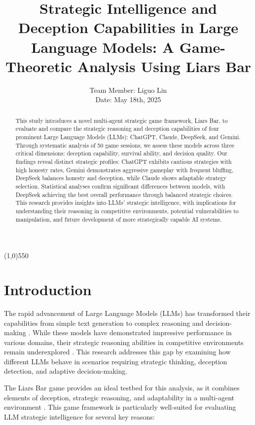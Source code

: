 \documentclass{article}
\title{Strategic Intelligence and Deception Capabilities in Large Language Models: A Game-Theoretic Analysis Using Liars Bar}
\author{Team Member: Liguo Lin \\ Date: May 18th, 2025}
\date{}
\begin{document}
\maketitle

\begin{abstract}
This study introduces a novel multi-agent strategic game framework, Liars Bar, to evaluate and compare the strategic reasoning and deception capabilities of four prominent Large Language Models (LLMs): ChatGPT, Claude, DeepSeek, and Gemini. Through systematic analysis of 50 game sessions, we assess these models across three critical dimensions: deception capability, survival ability, and decision quality. Our findings reveal distinct strategic profiles: ChatGPT exhibits cautious strategies with high honesty rates, Gemini demonstrates aggressive gameplay with frequent bluffing, DeepSeek balances honesty and deception, while Claude shows adaptable strategy selection. Statistical analyses confirm significant differences between models, with DeepSeek achieving the best overall performance through balanced strategic choices. This research provides insights into LLMs' strategic intelligence, with implications for understanding their reasoning in competitive environments, potential vulnerabilities to manipulation, and future development of more strategically capable AI systems.
\end{abstract}

\line(1,0){550} 
\section{Introduction}
The rapid advancement of Large Language Models (LLMs) has transformed their capabilities from simple text generation to complex reasoning and decision-making \cite{wei2022emergent, bubeck2023sparks}. While these models have demonstrated impressive performance in various domains, their strategic reasoning abilities in competitive environments remain underexplored \cite{gandhi2023}. This research addresses this gap by examining how different LLMs behave in scenarios requiring strategic thinking, deception detection, and adaptive decision-making.

The Liars Bar game provides an ideal testbed for this analysis, as it combines elements of deception, strategic reasoning, and adaptability in a multi-agent environment \cite{aher2023using}. This game framework is particularly well-suited for evaluating LLM strategic intelligence for several key reasons:
\end{document}
